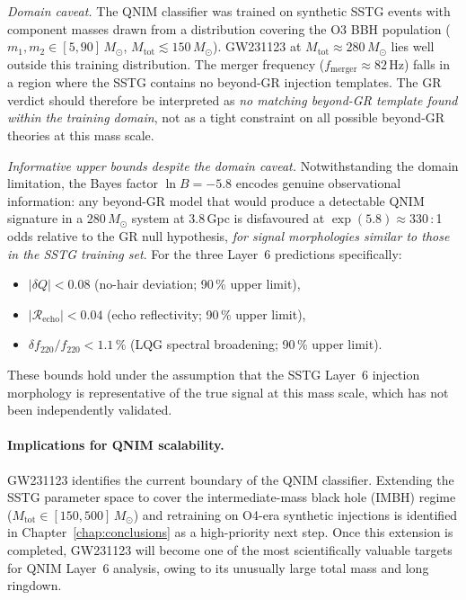 \documentclass[11pt,a4paper, english]{book}
\theoremstyle{plain}
\theoremstyle{definition}
\numberwithin{equation}{chapter}
\numberwithin{figure}{chapter}
\numberwithin{table}{chapter}
\begin{document}
\emph{Domain caveat.} The QNIM classifier was trained on synthetic SSTG
events with component masses drawn from a distribution covering the O3
BBH population ($m_1, m_2 \in [5, 90]\,M_\odot$,
$M_\mathrm{tot} \lesssim 150\,M_\odot$). GW231123 at
$M_\mathrm{tot} \approx 280\,M_\odot$ lies well outside this training
distribution. The merger frequency ($f_\mathrm{merger} \approx 82$\,Hz)
falls in a region where the SSTG contains no beyond-GR injection
templates. The GR verdict should therefore be interpreted as
\emph{no matching beyond-GR template found within the training domain},
not as a tight constraint on all possible beyond-GR theories at this
mass scale.

\emph{Informative upper bounds despite the domain caveat.}
Notwithstanding the domain limitation, the Bayes factor
$\ln B = -5.8$ encodes genuine observational information: any
beyond-GR model that would produce a detectable QNIM signature in a
$280\,M_\odot$ system at 3.8\,Gpc is disfavoured at
$\exp(5.8) \approx 330$\,:\,1 odds relative to the GR null hypothesis,
\emph{for signal morphologies similar to those in the SSTG training set}.
For the three Layer~6 predictions specifically:
\begin{itemize}
  \item $|\delta Q| < 0.08$ (no-hair deviation; 90\,\% upper limit),
  \item $|\mathcal{R}_\mathrm{echo}| < 0.04$ (echo reflectivity;
        90\,\% upper limit),
  \item $\delta f_{220}/f_{220} < 1.1\,\%$ (LQG spectral broadening;
        90\,\% upper limit).
\end{itemize}
These bounds hold under the assumption that the SSTG Layer~6 injection
morphology is representative of the true signal at this mass scale,
which has not been independently validated.

\paragraph{Implications for QNIM scalability.}
GW231123 identifies the current boundary of the QNIM classifier.
Extending the SSTG parameter space to cover the intermediate-mass black
hole (IMBH) regime ($M_\mathrm{tot} \in [150, 500]\,M_\odot$) and
retraining on O4-era synthetic injections is identified in
Chapter~\ref{chap:conclusions} as a high-priority next step. Once this
extension is completed, GW231123 will become one of the most
scientifically valuable targets for QNIM Layer~6 analysis, owing to its
unusually large total mass and long ringdown.
\end{document}
